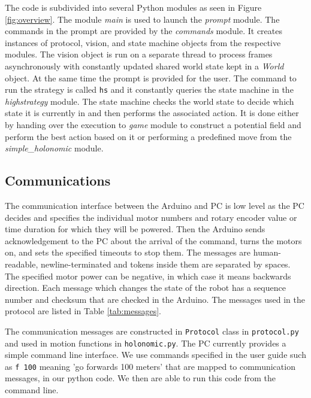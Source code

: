 \documentclass[a4paper,12pt]{article}
\begin{document}
The code is subdivided into several Python modules as seen in Figure \ref{fig:overview}. The module \textit{main} is used to launch the \textit{prompt} module. The commands in the prompt are provided by the \textit{commands} module. It creates instances of protocol, vision, and state machine objects from the respective modules. The vision object is run on a separate thread to process frames asynchronously with constantly updated shared world state kept in a \textit{World} object. At the same time the prompt is provided for the user. The command to run the strategy is called \texttt{hs} and it constantly queries the state machine in the \textit{highstrategy} module. The state machine checks the world state to decide which state it is currently in and then performs the associated action. It is done either by handing over the execution to \textit{game} module to construct a potential field and perform the best action based on it or performing a predefined move from the \textit{simple\_holonomic} module. 

\subsection{Communications}

The communication interface between the Arduino and PC is low level as
the PC decides and specifies the individual motor numbers and rotary encoder
value or time duration for which they will be powered. Then the Arduino
sends acknowledgement to the PC about the arrival of the command, turns the
motors on, and sets the specified timeouts to stop them.
The messages are human-readable, newline-terminated and tokens inside them are
separated by spaces. The specified motor power can be negative, in which case it means backwards direction. Each message which changes the state of the robot has a sequence number and checksum that are checked in the Arduino. The messages used in the
protocol are listed in Table \ref{tab:messages}.

The communication messages are constructed in \texttt{Protocol} class in \texttt{protocol.py} and used in motion functions in \texttt{holonomic.py}.
The PC currently provides a simple command line interface. We use commands specified in the user guide such as \texttt{f 100} meaning 'go forwards 100 meters' that are mapped to communication messages, in our python code. We then are able to run this code from the command line.
\end{document}
